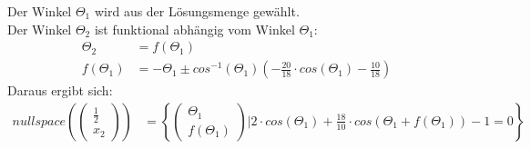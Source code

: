 Der Winkel $\Theta_1$ wird aus der Lösungsmenge gew\"ahlt.\\
Der Winkel $\Theta_2$ ist funktional abh\"angig vom Winkel $\Theta_1$:
\begin{align*}
\Theta_2 &= f(\Theta_1) \\
f(\Theta_1) &= -\Theta_1 \pm cos^{-1}(\Theta_1) \left( -\frac{20}{18} \cdot cos(\Theta_1) -\frac{10}{18} \right)
\end{align*}
Daraus ergibt sich:
\begin{align*}
nullspace \left( \left( \begin{matrix} \frac{1}{2} \\ x_2 \end{matrix} \right) \right) &= \left\lbrace \left( \begin{matrix}\Theta_1 \\ f(\Theta_1) \end{matrix} \right) | 2 \cdot cos(\Theta_1) + \frac{18}{10} \cdot cos(\Theta_1 + f(\Theta_1)) -1 = 0 \right\rbrace\\
\end{align*}